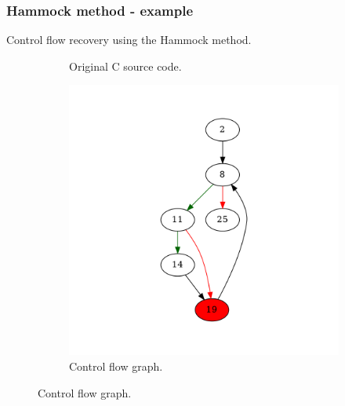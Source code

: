 \documentclass[aspectratio=1610]{beamer}
\begin{document}
\begin{frame}
	\frametitle{Hammock method - example}
	Control flow recovery using the Hammock method.
	\begin{figure}[htbp]
		\centering
		\begin{subfigure}[b]{0.30\textwidth}
			\centering
			
			\caption{Original C source code.}
		\end{subfigure}
		\begin{subfigure}[b]{0.50\textwidth}
			\centering
			\includegraphics[height=0.6\paperheight]{inc/methods/hammock/example/without-break/main_0001b.png}
			\caption{Control flow graph.}
		\end{subfigure}
	\end{figure}
\end{frame}
\end{document}
